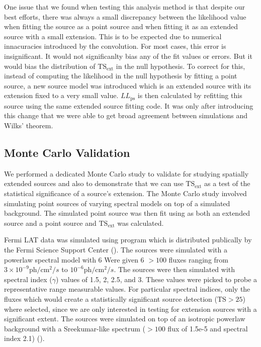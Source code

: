\documentclass[12pt,preprint]{aastex}
\newcommand{\mev}{\text{MeV}\xspace}
\newcommand{\ph}{\text{ph}\xspace}
\newcommand{\cm}{\text{cm}\xspace}
\newcommand{\tsext}{{\ensuremath{\text{TS}_\text{ext}}}\xspace}
\newcommand{\ts}{\text{TS}\xspace}
\newcommand{\pointlike}{\text{\em pointlike}\xspace}
\newcommand{\gtobssim}{\text{\em gtobssim}\xspace}
\begin{document}
One issue that we found when testing this analysis method is that
despite our best efforts, there was always a small discrepancy between
the likelihood value when fitting the source as a point source and when
fitting it as an extended source with a small extension.  This is to be
expected due to numerical innacuracies introduced by the convolution.
For most cases, this error is insignificant. It would not significanlty
bias any of the fit values or errors. But it would bias the distribution
of $\tsext$ in the null hypothesis. To correct for this,
instead of computing the likelihood in the null hypothesis by fitting
a point source, a new source model was introduced which is an extended
source with its extension fixed to a very small value. $LL_\text{ps}$
is then calculated by refitting this source using the same extended
source fitting code. It was only after introducing this change that we
were able to get broad agreement between simulations and Wilks' theorem.


\subsection{Monte Carlo Validation} \label{monte_carlo_validation}

We performed a dedicated Monte Carlo study to validate \pointlike for
studying spatially extended sources and also to demonstrate that we can
use $\tsext$ as a test of the statistical significance
of a source's extension.  The Monte Carlo study involved simulating point
sources of varying spectral models on top of a simulated background. The
simulated point source was then fit using \pointlike as both an extended
source and a point source and $\tsext$ was calculated.

Fermi LAT data was simulated using program \gtobssim which is
distributed publically by the Fermi Science Support Center
(\cite{fssc}).  The sources were simulated with a powerlaw spectral
model with 6 Were given 6 $>100$ \mev fluxes ranging from $3\times 10^{-9}
\ph/\cm^2/s$ to $10^{-6} \ph/\cm^2/s$.  The sources were then simulated
with spectral index ($\gamma$) values of 1.5, 2, 2.5, and 3.  These
values were picked to probe a representative range measurable values.
For particular spectral indices, only the fluxes which would create a
statistically significant source detection ($\ts>25$) where selected,
since we are only interested in testing for extension sources with a
significant extent. The sources were simulated on top of an isotropic
powerlaw background with a Sreekumar-like spectrum ($>100$ \mev flux
of 1.5e-5 and spectral index 2.1) (\cite{sreekumar_isotropic}).
\end{document}
